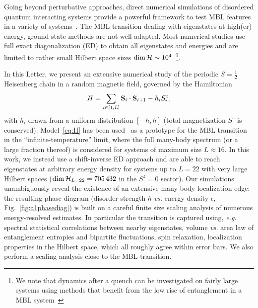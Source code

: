 \documentclass[prl,a4paper,twocolumn,groupedaddress,english,showpacs]{revtex4-1}
\def\be{\begin{equation}} \def\ee{\end{equation}}
\begin{document}
Going beyond perturbative approaches, direct numerical simulations of disordered quantum interacting
systems provide a powerful framework to test MBL features in a variety of
systems~\cite{oganesyan_localization_2007,pal_many-body_2010,znidaric_many_2008,cavoni_quantum_2011,cuevas_level_2012,bauer_area_2013,serbyn_interferometric_2014,kjall_many-body_2014,luca_ergodicity_2013,Iyer_many_2014,pekker_hilbert_2014,johri_numerical_2014,bardarson_unbounded_2012,andraschko_purification_2014,laumann_many_2014,vasseur_quantum_2014,hickey_signatures_2014,nanduri_entanglement_2014,barlev_dynamic_2014}.
The MBL transition dealing with eigenstates at high(er) energy, ground-state methods are not well
adapted. Most numerical studies use full exact diagonalization (ED) to obtain all eigenstates and
energies and are limited to rather small Hilbert space sizes $\dim{\cal H} \sim 10^4$~\footnote{We
    note that dynamics after a quench can be investigated on fairly large systems using methods that
    benefit from the low rise of entanglement in a MBL
    system~\cite{znidaric_many_2008,bardarson_unbounded_2012,andraschko_purification_2014}}. 
    
    In this Letter, we present an extensive numerical study of the periodic $S=\frac{1}{2}$ Heisenberg
    chain in a random magnetic field, governed by the Hamiltonian
%
\be H=\sum_{i\in [1,L]} {\bf S}_i \cdot {\bf  S}_{i+1} -h_iS_i^z, \label{eq:H} \ee
%
with $h_i$ drawn from a uniform distribution $[-h,h]$ (total magnetization $S^z$ is
conserved). Model~\eqref{eq:H} has been
used~\cite{pal_many-body_2010,bauer_area_2013,luca_ergodicity_2013,nanduri_entanglement_2014} as a
prototype for the MBL transition in the ``infinite-temperature'' limit, where the full many-body
spectrum (or a large fraction thereof) is considered for systems of maximum size $L\approx 16$. In
this work, we instead use a shift-inverse ED approach and are able to reach eigenstates at arbitrary
energy density for systems up to $L=22$ with very large Hilbert spaces ($ \dim{{\cal
H}_{L=22}}=705\,432$ in the $S^z=0$ sector). Our simulations unambiguously reveal the existence of
an extensive
many-body localization edge: the resulting phase diagram (disorder strength $h$ {\it{vs.}} energy
density $\epsilon$, Fig.~\ref{fig:a1phasediag}) is built on a careful finite size scaling analysis
of numerous energy-resolved estimates. In particular the transition is captured using, {\it{e.g.}}
spectral statistical correlations between nearby eigenstates, volume {\it{vs.}} area law of
entanglement entropies and bipartite fluctuations, spin relaxation, localization properties in the
Hilbert space, which all roughly agree within error
bars. We also perform a scaling analysis close to the MBL transition.
 
\end{document}
